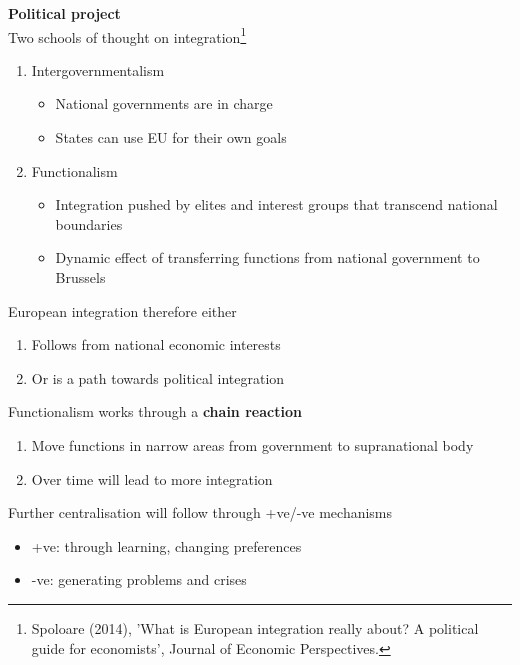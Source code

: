 \documentclass{beamer}
\begin{document}
\begin{frame}
  \textbf{Political project}\\
  Two schools of thought on integration\footnote{Spoloare (2014), 'What is European integration really about? A political guide for economists', Journal of Economic Perspectives.}
  \begin{enumerate}
    \item Intergovernmentalism
    \begin{itemize}
      \item National governments are in charge
      \item States can use EU for their own goals
    \end{itemize}
    \medskip
    \item Functionalism
    \begin{itemize}
      \item Integration pushed by elites and interest groups that transcend national boundaries
      \item Dynamic effect of transferring functions from national government to Brussels
    \end{itemize}
  \end{enumerate}
\end{frame}

\begin{frame}
  European integration therefore either
  \medskip
  \begin{enumerate}
    \item Follows from national economic interests
    \medskip
    \item Or is a path towards political integration
  \end{enumerate}  
\end{frame}

\begin{frame}
  Functionalism works through a \textbf{chain reaction}
  \begin{enumerate}
    \item Move functions in narrow areas from government to supranational body
    \item Over time will lead to more integration 
  \end{enumerate}
  \medskip
  Further centralisation will follow through +ve/-ve mechanisms
  \begin{itemize}
    \item +ve: through learning, changing preferences
    \item -ve: generating problems and crises
  \end{itemize}
\end{frame}
\end{document}
